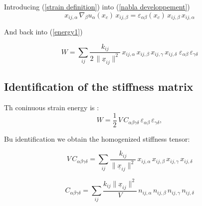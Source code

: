 \documentclass[10pt, onecolumn]{article}
\begin{document}
Introducing (\ref{strain definition}) into (\ref{nabla developpement})
\begin{equation}
    x_{ij,\alpha}\,\nabla_\beta u_\alpha(x_c)\,x_{ij,\beta} = \varepsilon_{\alpha\beta} (x_c)\,x_{ij,\beta} \,x_{ij,\alpha}
\end{equation}

And back into (\ref{energy1})

\begin{equation}
    W = \sum_{ij} \frac{k_{ij}}{2\,\|\underline{x}_{ij}\|^2}\, x_{ij,\alpha}\,x_{ij,\beta}\,x_{ij,\gamma}\,x_{ij,\delta}\;\varepsilon_{\alpha\beta} \,\varepsilon_{\gamma\delta}
\end{equation}

\subsection{Identification of the stiffness matrix}

Th coninuous strain energy is :
\begin{equation}
W = \frac{1}{2}\,V\, C_{\alpha\beta\gamma\delta}\, \varepsilon_{\alpha\beta}\,\varepsilon_{\gamma\delta},
\end{equation}


Bu identification we obtain the homogenized stiffness tensor:

\begin{equation}
V\, C_{\alpha\beta\gamma\delta} = \sum_{ij} \frac{k_{ij}}{\|\underline{x}_{ij}\|^2}\, x_{ij,\alpha}\, x_{ij,\beta}\, x_{ij,\gamma}\, x_{ij,\delta}
\end{equation}

\begin{equation}
C_{\alpha\beta\gamma\delta} = \sum_{ij} \frac{k_{ij}\|\underline{x}_{ij}\|^2}{ V}\, n_{ij,\alpha}\, n_{ij,\beta}\, n_{ij,\gamma}\, n_{ij,\delta}
\label{general energy match}
\end{equation}

\printbibliography
\end{document}
